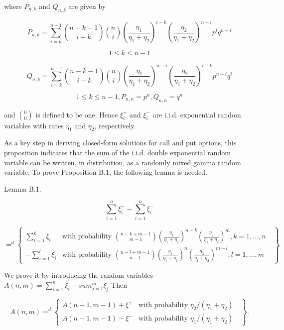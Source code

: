 where $P_{n,k}$ and $Q_{n,k}$ are given by

$$P_{n,k}=\sum_{i=k}^{n-1}\binom {n-k-1} {i-k}\binom {n} {i}(\frac{\eta_{1}}{\eta_{1}+\eta_{2}})^{i-k}(\frac{\eta_{2}}{\eta_{1}+\eta_{2}})^{n-i}p^{i}q^{n-i}$$

$$1\leq k\leq n-1$$

$$Q_{n,k}=\sum_{i=k}^{n-1}\binom {n-k-1} {i-k}\binom {n} {i}(\frac{\eta_{1}}{\eta_{1}+\eta_{2}})^{n-i}(\frac{\eta_{2}}{\eta_{1}+\eta_{2}})^{i-k}p^{n-i}q^{i}$$

$$1\leq k\leq n-1, P_{n,n}=p^{n},Q_{n,n}=q^{n}$$

and $\binom{0}{0}$ is defined to be one. Hence $\xi_{i}^{+}$ and $\xi_{i}^{-}$ are i.i.d. exponential random variables with rates $\eta_{1}$ and $\eta_{2}$, respectively.

As a key step in deriving closed-form solutions for call and put options, this proposition indicates that the sum of the i.i.d. double exponential random variable can be written, in distribution, as a randomly mixed gamma random variable. To prove Proposition B.1, the following lemma is needed.

Lemma B.1.

$$\sum_{i=1}^{n}\xi_{i}^{+}-\sum_{i=1}^{n}\xi_{i}^{-}$$

\begin{equation*}
=^{d}\left\{
\begin{array}{rl}
\sum_{i=1}^{k}\xi_{i} & \text{with probability $\binom {n-k+m-1} {m-1}(\frac{\eta_{1}}{\eta_{1}+\eta_{2}})^{n-k}(\frac{\eta_{2}}{\eta_{1}+\eta_{2}})^{m}, k=1,...,n$ }\\
-\sum_{i=1}^{l}\xi_{i} & \text{with probability $\binom {n-l+m-1} {n-1}(\frac{\eta_{1}}{\eta_{1}+\eta_{2}})^{n}(\frac{\eta_{2}}{\eta_{1}+\eta_{2}})^{m-l}, l=1,...,m$ }
\end{array}\right\}.
\end{equation*}

We prove it by introducing the random variables $A(n,m) = \sum_{i=1}^{n}\xi_{i}-sum_{j=1}^{m}\tilde{\xi}_{j}$ Then

\begin{equation*}
A(n,m) =^{d}\left\{
\begin{array}{rl}
A(n-1,m-1)+\xi^{+} & \text{with probability $\eta_{2}/(\eta_{1}+\eta_{2})$ }\\
A(n-1,m-1)-\xi^{-} & \text{with probability $\eta_{1}/(\eta_{1}+\eta_{2})$ }
\end{array}\right\}.
\end{equation*}


